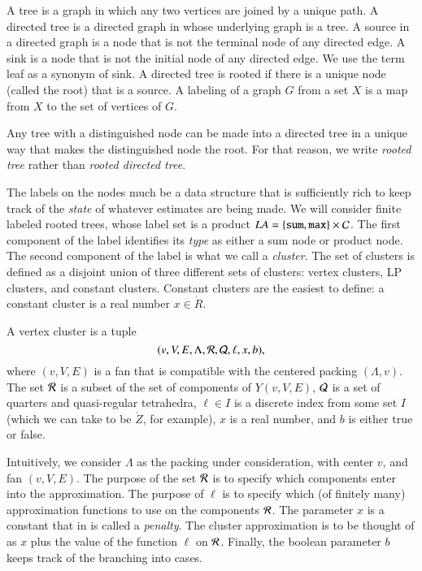 
\begin{definition}
A tree is a graph in which any two vertices are joined by a unique path.
A directed tree is a directed graph in whose underlying graph is a tree.
A source in a directed graph is a node that is not the terminal node
of any directed edge.  A sink is a node that is not the initial node
of any directed edge.  We use the term leaf as a synonym of sink.
A directed tree is rooted if there is a unique node (called
the root) that is a source.
A labeling of a graph $G$ from a set $X$ is a map from $X$ to the set
of vertices of $G$.
\end{definition}

Any tree with a distinguished node can be made into a directed
tree in a unique way that makes the distinguished node the root. 
For that reason, we write {\it rooted tree} rather than
{\it rooted directed tree}.

The labels on the nodes much be a data structure that is sufficiently
rich to keep track of the {\it state} of whatever estimates are
being made.
We will consider finite labeled rooted trees, whose label set
is a product $LA=\{{\tt sum, max}\} \times {\cal C}$.   The first
component of the label identifies its {\it type} as either a sum
node or product node. 
The second component of the label is what we call a {\it cluster}.
The set of clusters is defined as a disjoint union of three different sets
of clusters:  vertex clusters, LP clusters, and constant clusters.
Constant clusters are the easiest to define: a constant cluster
is a real number $x\in\ring{R}$.  

\begin{definition}
A vertex
cluster is a tuple
    $$
    (v,V,E,\Lambda,{\cal R},{\cal Q},\ell,x,b),
    $$
where $(v,V,E)$ is a fan that is compatible with
the centered packing $(\Lambda,v)$.  
The set ${\cal R}$ is a subset of the set of components of $Y(v,V,E)$,
${\cal Q}$ is a set of quarters and quasi-regular tetrahedra,
$\ell\in I$ is a discrete index from some set $I$ (which we can
take to be $\ring{Z}$, for example), 
$x$ is a real number, and
$b$ is either true or false.
\end{definition}

Intuitively, we consider $\Lambda$ as the packing under
consideration, with center $v$, and fan $(v,V,E)$.
The purpose of the set ${\cal R}$ is to specify which components
enter into the approximation.  The purpose of $\ell$ is to specify
which (of finitely many) approximation functions to use on the
components ${\cal R}$.  The parameter $x$ is a constant that in \cite{DCG}
is called a {\it penalty}.  The cluster approximation is to be
thought of as $x$ plus the value of the function $\ell$ on ${\cal R}$.
Finally, the boolean parameter $b$ keeps track of the branching into
cases.

